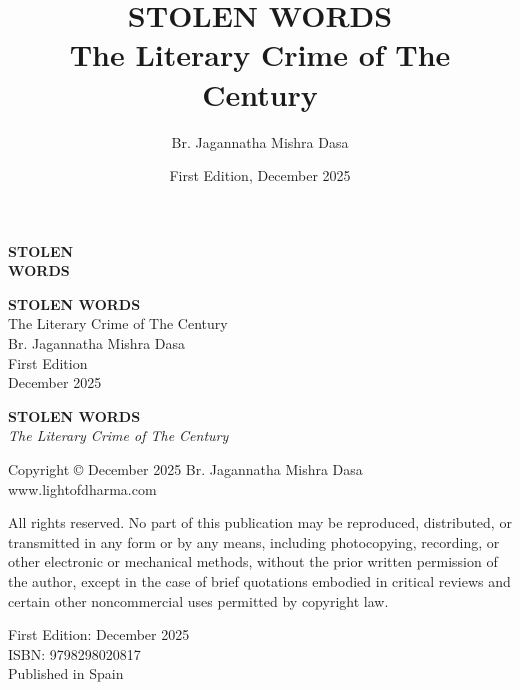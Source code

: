 \documentclass[12pt,twoside]{book}
\author{Br. Jagannatha Mishra Dasa}
\date{First Edition, December 2025}
\title{STOLEN WORDS\\\medskip
\large The Literary Crime of The Century}
\begin{document}
\thispagestyle{empty}
\vspace*{0.22\textheight}
\begin{center}
{\fontsize{40}{48}\selectfont\textbf{STOLEN}}\\[0.6cm]
{\fontsize{40}{48}\selectfont\textbf{WORDS}}
\end{center}
\vspace*{\fill}
\clearpage

\thispagestyle{empty}
\mbox{}
\newpage

\thispagestyle{empty}
\vspace*{0.18\textheight}
\begin{center}
{\fontsize{36}{42}\selectfont\textbf{STOLEN WORDS}}\\[0.5cm]
{\large The Literary Crime of The Century}\\
\vspace{0.15\textheight}
{\Large Br. Jagannatha Mishra Dasa}\\
\vspace*{\fill}
{\normalsize First Edition}\\[0.3cm]
{\normalsize December 2025}\\[1cm]
\end{center}
\clearpage

\thispagestyle{empty}
\textbf{STOLEN WORDS}\\
\emph{The Literary Crime of The Century}

Copyright © December 2025 Br. Jagannatha Mishra Dasa\\
www.lightofdharma.com

All rights reserved. No part of this publication may be reproduced, distributed, or transmitted in any form or by any means, including photocopying, recording, or other electronic or mechanical methods, without the prior written permission of the author, except in the case of brief quotations embodied in critical reviews and certain other noncommercial uses permitted by copyright law.

\vspace*{\fill}

First Edition: December 2025\\
ISBN: 9798298020817\\
Published in Spain

\clearpage

\thispagestyle{empty}
{\let\clearpage\relax\tableofcontents}

\clearpage
\end{document}
